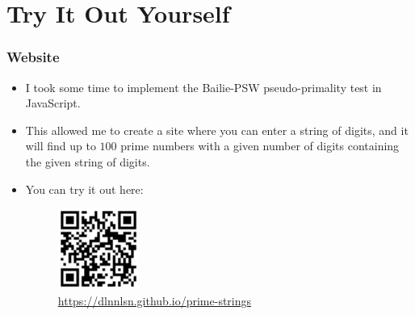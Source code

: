 \documentclass{beamer}
\begin{document}
\section{Try It Out Yourself}

\begin{frame}
    \frametitle{Website}

    \begin{itemize}
        \item I took some time to implement the Bailie-PSW pseudo-primality test in JavaScript. \pause
        \item This allowed me to create a site where you can enter a string of digits, and it will find up to $100$ prime numbers with a given number of digits containing the given string of digits. \pause
        \item You can try it out here:
        \begin{figure}
            \centering
            \includegraphics[width=0.25\textwidth]{prime_strings.png}
            \caption{\url{https://dlnnlsn.github.io/prime-strings}}
        \end{figure}
    \end{itemize}

\end{frame}
\end{document}
